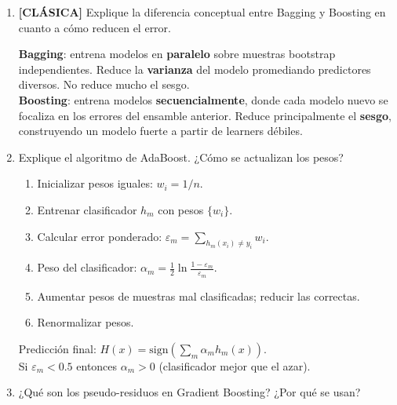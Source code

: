 \documentclass[11pt,a4paper]{article}
\begin{document}
\begin{enumerate}[label=\textbf{P\arabic*.}, resume]

\item \leavevmode

\begin{classicbox}
\textcolor{tdred}{\textbf{[CL\'ASICA]}} Explique la diferencia conceptual entre Bagging
y Boosting en cuanto a c\'omo reducen el error.
\end{classicbox}

\begin{answerbox}
\textbf{Bagging}: entrena modelos en \textbf{paralelo} sobre muestras bootstrap
independientes. Reduce la \textbf{varianza} del modelo promediando predictores
diversos. No reduce mucho el sesgo.\\[4pt]
\textbf{Boosting}: entrena modelos \textbf{secuencialmente}, donde cada modelo nuevo
se focaliza en los errores del ensamble anterior. Reduce principalmente el \textbf{sesgo},
construyendo un modelo fuerte a partir de learners d\'ebiles.
\end{answerbox}

\item Explique el algoritmo de AdaBoost. ¿C\'omo se actualizan los pesos?

\begin{answerbox}
\begin{enumerate}[label=\arabic*., topsep=2pt, itemsep=2pt]
  \item Inicializar pesos iguales: $w_i = 1/n$.
  \item Entrenar clasificador $h_m$ con pesos $\{w_i\}$.
  \item Calcular error ponderado: $\varepsilon_m = \sum_{h_m(x_i)\neq y_i} w_i$.
  \item Peso del clasificador: $\alpha_m = \frac{1}{2}\ln\frac{1-\varepsilon_m}{\varepsilon_m}$.
  \item Aumentar pesos de muestras mal clasificadas; reducir las correctas.
  \item Renormalizar pesos.
\end{enumerate}
Predicci\'on final: $H(x) = \text{sign}\left(\sum_m \alpha_m h_m(x)\right)$.\\
Si $\varepsilon_m < 0.5$ entonces $\alpha_m > 0$ (clasificador mejor que el azar).
\end{answerbox}

\item ¿Qu\'e son los pseudo-residuos en Gradient Boosting? ¿Por qu\'e se usan?


\end{enumerate}
\end{document}
